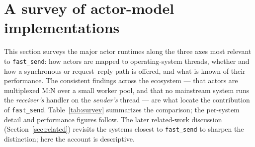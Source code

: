 \documentclass[11pt]{article}
\newcommand{\fs}{\texttt{fast\_send}}
\begin{document}
\section{A survey of actor-model implementations}
\label{sec:survey}

This section surveys the major actor runtimes along the three axes most relevant
to \fs{}: how actors are mapped to operating-system threads, whether and how a
synchronous or request--reply path is offered, and what is known of their
performance. The consistent findings across the ecosystem --- that actors are
multiplexed M:N over a small worker pool, and that no mainstream system runs the
\emph{receiver's} handler on the \emph{sender's} thread --- are what locate the
contribution of \fs{}. Table~\ref{tab:survey} summarizes the comparison; the
per-system detail and performance figures follow. The later related-work
discussion (Section~\ref{sec:related}) revisits the systems closest to \fs{} to
sharpen the distinction; here the account is descriptive.
\end{document}
